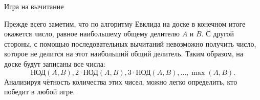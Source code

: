 \begin{tutorial}{Игра на вычитание}

Прежде всего заметим, что по алгоритму Евклида на доске в конечном итоге окажется число, равное наибольшему общему делителю $A$ и $B$. С другой стороны, с помощью последовательных вычитаний невозможно получить число, которое не делится на этот наибольший общий делитель.
Таким образом, на доске будут записаны все числа: $$\text{НОД}(A, B), 2\cdot\text{НОД}(A, B), 3\cdot\text{НОД}(A, B), \ldots, \max(A, B).$$ Анализируя чётность количества этих чисел, можно легко определить, кто победит в любой игре.

\end{tutorial}
